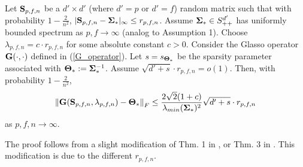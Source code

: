 \begin{proposition} \label{prop: Glasso_optimal_rate}
	Let ${\mathbf{S}}_{p,f,n}$ be a $d'\times d'$ (where $d'=p$ or $d'=f$) random matrix such that with probability $1-\frac{2}{n^2}$, $|{\mathbf{S}}_{p,f,n}-{\mathbf{\Sigma}}_*|_\infty \leq r_{p,f,n}$. Assume ${\mathbf{\Sigma}}_*\in S_{++}^{d'}$ has uniformly bounded spectrum as $p,f\to\infty$ (analog to Assumption 1). Choose $\lambda_{p,f,n} = c \cdot r_{p,f,n}$ for some absolute constant $c>0$. Consider the Glasso operator ${\mathbf{G}}(\cdot,\cdot)$ defined in (\ref{G_operator}). Let $s=s_{{\mathbf{\Theta}}_*}$ be the sparsity parameter associated with ${\mathbf{\Theta}}_*:={\mathbf{\Sigma}}_*^{-1}$. Assume $\sqrt{d'+s} \cdot r_{p,f,n}=o(1)$. Then, with probability $1-\frac{2}{n^2}$,
	\begin{equation*}
		{ \parallel } {\mathbf{G}}({\mathbf{S}}_{p,f,n},\lambda_{p,f,n})-{\mathbf{\Theta}}_* { \parallel }_F \leq \frac{2\sqrt{2} (1+c)}{\lambda_{min}({\mathbf{\Sigma}}_*)^2} \sqrt{d'+s} \cdot r_{p,f,n}
	\end{equation*}
	as $p,f,n\to\infty$.
\end{proposition}
\begin{IEEEproof}
	The proof follows from a slight modification of Thm. 1 in \cite{Rothman}, or Thm. 3 in \cite{TimeVaryingGraphs}. This modification is due to the different $r_{p,f,n}$.
\end{IEEEproof}
